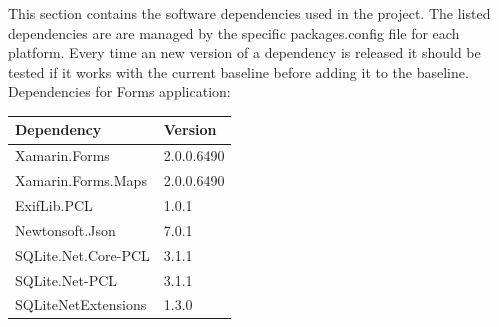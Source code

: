 \documentclass[12pt]{article}
\begin{document}
	This section contains the software dependencies used in the project. The listed dependencies are are managed by the specific packages.config file for each platform. Every time an new version of a dependency is released it should be tested if it works with the current baseline before adding it to the baseline.
	\clearpage
	Dependencies for Forms application:
	\begin{table}[htbp]
		\begin{tabular}{ p{10cm}  p{2cm} }
			\textbf{Dependency} & \textbf{Version} \\ \hline
			Xamarin.Forms & 2.0.0.6490	 \\
			Xamarin.Forms.Maps & 2.0.0.6490	 \\
			ExifLib.PCL & 1.0.1 \\
			Newtonsoft.Json & 7.0.1 \\
			SQLite.Net.Core-PCL & 3.1.1 \\
			SQLite.Net-PCL & 3.1.1 \\
			SQLiteNetExtensions & 1.3.0
		\end{tabular}
	\end{table}
\end{document}
